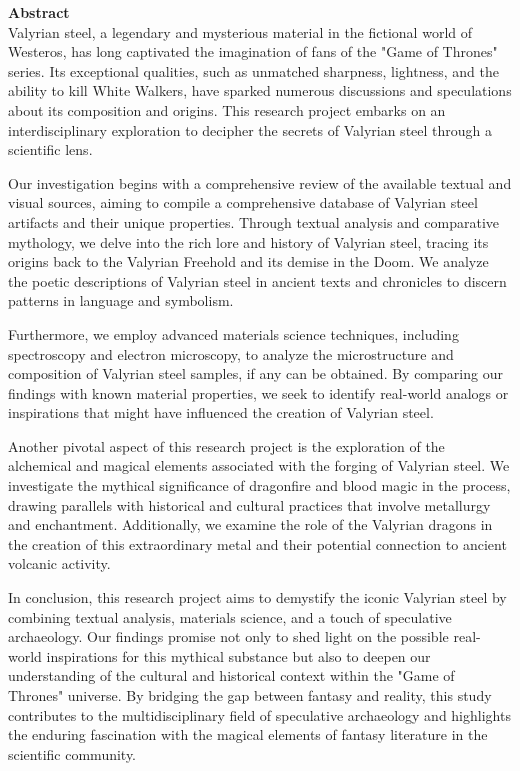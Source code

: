 \thispagestyle{plain}
\Huge
\textbf{Abstract}
\vspace{1cm}
\normalsize
\\
Valyrian steel, a legendary and mysterious material in the fictional world of Westeros, has long captivated the imagination of fans of the "Game of Thrones" series. Its exceptional qualities, such as unmatched sharpness, lightness, and the ability to kill White Walkers, have sparked numerous discussions and speculations about its composition and origins. This research project embarks on an interdisciplinary exploration to decipher the secrets of Valyrian steel through a scientific lens.

Our investigation begins with a comprehensive review of the available textual and visual sources, aiming to compile a comprehensive database of Valyrian steel artifacts and their unique properties. Through textual analysis and comparative mythology, we delve into the rich lore and history of Valyrian steel, tracing its origins back to the Valyrian Freehold and its demise in the Doom. We analyze the poetic descriptions of Valyrian steel in ancient texts and chronicles to discern patterns in language and symbolism.

Furthermore, we employ advanced materials science techniques, including spectroscopy and electron microscopy, to analyze the microstructure and composition of Valyrian steel samples, if any can be obtained. By comparing our findings with known material properties, we seek to identify real-world analogs or inspirations that might have influenced the creation of Valyrian steel.

Another pivotal aspect of this research project is the exploration of the alchemical and magical elements associated with the forging of Valyrian steel. We investigate the mythical significance of dragonfire and blood magic in the process, drawing parallels with historical and cultural practices that involve metallurgy and enchantment. Additionally, we examine the role of the Valyrian dragons in the creation of this extraordinary metal and their potential connection to ancient volcanic activity.

In conclusion, this research project aims to demystify the iconic Valyrian steel by combining textual analysis, materials science, and a touch of speculative archaeology. Our findings promise not only to shed light on the possible real-world inspirations for this mythical substance but also to deepen our understanding of the cultural and historical context within the "Game of Thrones" universe. By bridging the gap between fantasy and reality, this study contributes to the multidisciplinary field of speculative archaeology and highlights the enduring fascination with the magical elements of fantasy literature in the scientific community.

\mdseries




